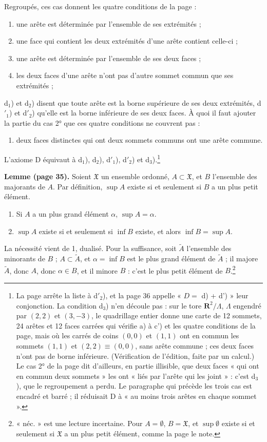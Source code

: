 \documentclass[11pt,a4paper]{article}
\begin{document}
Regroupés, ces cas donnent les quatre conditions de la page :
\begin{enumerate}
\item[d$_{1}$)] une arête est déterminée par l'ensemble de ses extrémités ;
\item[d$_{2}$)] une face qui contient les deux extrémités d'une arête contient
celle-ci ;
\item[d$'_{1}$)] une arête est déterminée par l'ensemble de ses deux faces ;
\item[d$'_{2}$)] les deux faces d'une arête n'ont pas d'autre sommet commun que
ses extrémités ;
\end{enumerate}
d$_{1}$) et d$_{2}$) disent que toute arête est la borne supérieure de ses deux
extrémités, d$'_{1}$) et d$'_{2}$) qu'elle est la borne inférieure de ses deux
faces. À quoi il faut ajouter la partie du cas 2° que ces quatre conditions ne
couvrent pas :
\begin{enumerate}
\item[d$_{3}$)] deux faces distinctes qui ont deux sommets communs ont une arête
commune.
\end{enumerate}
L'axiome D équivaut à d$_{1}$), d$_{2}$), d$'_{1}$), d$'_{2}$) et
d$_{3}$).\footnote{La page arrête la liste à d$'_{2}$), et la page 36 appelle
« $D = $ d) + d') » leur conjonction. La condition d$_{3}$) n'en découle pas : sur
le tore $\mathbf{R}^{2}/\Lambda$, $\Lambda$ engendré par $(2,2)$ et $(3,-3)$,
le quadrillage entier donne une carte de 12 sommets, 24 arêtes et 12 faces
carrées qui vérifie a) à c') et les quatre conditions de la page, mais où les
carrés de coins $(0,0)$ et $(1,1)$ ont en commun les sommets $(1,1)$ et
$(2,2) \equiv (0,0)$, sans arête commune ; ces deux faces n'ont pas de borne
inférieure. (Vérification de l'édition, faite par un calcul.) Le cas 2° de la
page dit d'ailleurs, en partie illisible, que deux faces « qui ont en commun deux
sommets » les ont « liés par l'arête qui les joint » : c'est d$_{3}$), que le
regroupement a perdu. Le paragraphe qui précède les trois cas est encadré et
barré ; il réduisait D à « au moins trois arêtes en chaque sommet ».}

\textbf{Lemme (page 35).} Soient $\mathfrak{X}$ un ensemble ordonné, $A \subset
\mathfrak{X}$, et $B$ l'ensemble des majorants de $A$. Par définition,
$\sup A$ existe si et seulement si $B$ a un plus petit élément.
\begin{enumerate}
\item[1.] Si $A$ a un plus grand élément $\alpha$, $\sup A = \alpha$.
\item[2.] $\sup A$ existe si et seulement si $\inf B$ existe, et alors $\inf B =
\sup A$.
\end{enumerate}
La nécessité vient de 1, dualisé. Pour la suffisance, soit $\widetilde{A}$
l'ensemble des minorants de $B$ ; $A \subset \widetilde{A}$, et
$\alpha = \inf B$ est le plus grand élément de $\widetilde{A}$ ; il majore
$\widetilde{A}$, donc $A$, donc $\alpha \in B$, et il minore $B$ : c'est le plus
petit élément de $B$.\footnote{« néc. » est une lecture incertaine. Pour
$A = \emptyset$, $B = \mathfrak{X}$, et $\sup \emptyset$ existe si et seulement
si $\mathfrak{X}$ a un plus petit élément, comme la page le note.}
\end{document}
